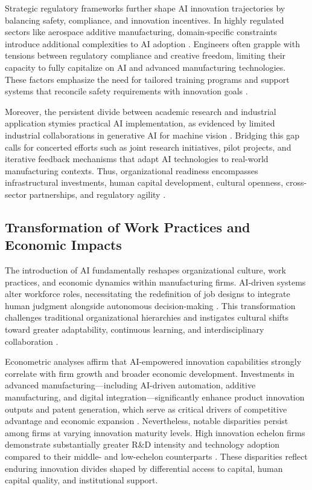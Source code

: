 \documentclass[sigconf]{acmart}
\begin{document}
Strategic regulatory frameworks further shape AI innovation trajectories by balancing safety, compliance, and innovation incentives. In highly regulated sectors like aerospace additive manufacturing, domain-specific constraints introduce additional complexities to AI adoption \cite{ref13}. Engineers often grapple with tensions between regulatory compliance and creative freedom, limiting their capacity to fully capitalize on AI and advanced manufacturing technologies. These factors emphasize the need for tailored training programs and support systems that reconcile safety requirements with innovation goals \cite{ref9}.

Moreover, the persistent divide between academic research and industrial application stymies practical AI implementation, as evidenced by limited industrial collaborations in generative AI for machine vision \cite{ref3}. Bridging this gap calls for concerted efforts such as joint research initiatives, pilot projects, and iterative feedback mechanisms that adapt AI technologies to real-world manufacturing contexts. Thus, organizational readiness encompasses infrastructural investments, human capital development, cultural openness, cross-sector partnerships, and regulatory agility \cite{ref36}.

\subsection{Transformation of Work Practices and Economic Impacts}

The introduction of AI fundamentally reshapes organizational culture, work practices, and economic dynamics within manufacturing firms. AI-driven systems alter workforce roles, necessitating the redefinition of job designs to integrate human judgment alongside autonomous decision-making \cite{ref19}. This transformation challenges traditional organizational hierarchies and instigates cultural shifts toward greater adaptability, continuous learning, and interdisciplinary collaboration \cite{ref20}.

Econometric analyses affirm that AI-empowered innovation capabilities strongly correlate with firm growth and broader economic development. Investments in advanced manufacturing—including AI-driven automation, additive manufacturing, and digital integration—significantly enhance product innovation outputs and patent generation, which serve as critical drivers of competitive advantage and economic expansion \cite{ref21}. Nevertheless, notable disparities persist among firms at varying innovation maturity levels. High innovation echelon firms demonstrate substantially greater R&D intensity and technology adoption compared to their middle- and low-echelon counterparts \cite{ref28}. These disparities reflect enduring innovation divides shaped by differential access to capital, human capital quality, and institutional support.
\end{document}
